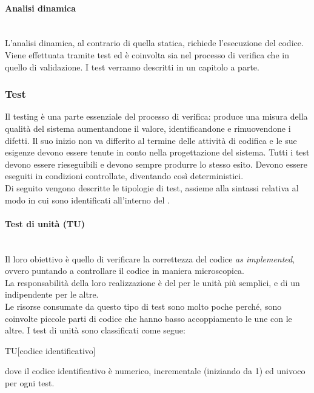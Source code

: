 	\paragraph{Analisi dinamica}
	~\\L'analisi dinamica, al contrario di quella statica, richiede l'esecuzione del codice.
	Viene effettuata tramite test ed è coinvolta sia nel processo di verifica che in quello di validazione.
	I test verranno descritti in un capitolo a parte.
	\subsubsection{Test}
	Il testing è una parte essenziale del processo di verifica: produce una misura della qualità del sistema
	aumentandone il valore, identificandone e rimuovendone i difetti. Il suo inizio non va differito
	al termine delle attività di codifica e le sue esigenze devono essere tenute in conto nella progettazione del sistema. Tutti i test devono essere rieseguibili e devono sempre produrre lo stesso esito. Devono essere eseguiti in condizioni controllate, diventando così deterministici.
	~\\Di seguito vengono descritte le tipologie di test, assieme alla sintassi relativa al modo in cui sono identificati all'interno del \PdQ.
		\paragraph{Test di unità (TU)}
		~\\Il loro obiettivo è quello di verificare la correttezza del codice \emph{as implemented}, ovvero
		puntando a controllare il codice in maniera microscopica.
		\\La responsabilità della loro realizzazione è del \progr{} per le unità più semplici, e di un \ver{} indipendente per le altre.
		\\Le risorse consumate da questo tipo di test sono molto poche perché,  sono coinvolte piccole parti di codice che hanno basso accoppiamento le une con le altre. I test di unità sono classificati come segue:
		\begin{center} TU[codice identificativo]\end{center}
		dove il codice identificativo è numerico, incrementale (iniziando da 1) ed univoco per ogni test.		
		
